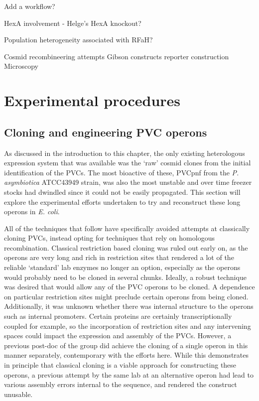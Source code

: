 Add a workflow?

HexA involvement - Helge's HexA knockout?

Population heterogeneity associated with RFaH?

Cosmid recombineering attempts
Gibson constructs
reporter construction
Microscopy

\section{Experimental procedures}

\subsection{Cloning and engineering PVC operons}
As discussed in the introduction to this chapter, the only existing heterologous expression system that was available was the `raw' cosmid clones from the initial identification of the PVCs. The most bioactive of these, PVCpnf from the \emph{P. asymbiotica} ATCC43949 strain, was also the most unstable and over time freezer stocks had dwindled since it could not be easily propagated. This section will explore the experimental efforts undertaken to try and reconstruct these long operons in \emph{E. coli}.

All of the techniques that follow have specifically avoided attempts at classically cloning PVCs, instead opting for techniques that rely on homologous recombination. Classical restriction based cloning was ruled out early on, as the operons are very long and rich in restriction sites that rendered a lot of the reliable `standard' lab enzymes no longer an option, especially as the operons would probably need to be cloned in several chunks. Ideally, a robust technique was desired that would allow any of the PVC operons to be cloned. A dependence on particular restriction sites might preclude certain operons from being cloned. Additionally, it was unknown whether there was internal structure to the operons such as internal promoters. Certain proteins are certainly transcriptionally coupled for example, so the incorporation of restriction sites and any intervening spaces could impact the expression and assembly of the PVCs. However, a previous post-doc of the group did achieve the cloning of a single operon in this manner separately, contemporary with the efforts here. While this demonstrates in principle that classical cloning is a viable approach for constructing these operons, a previous attempt by the same lab at an alternative operon had lead to various assembly errors internal to the sequence, and rendered the construct unusable.

